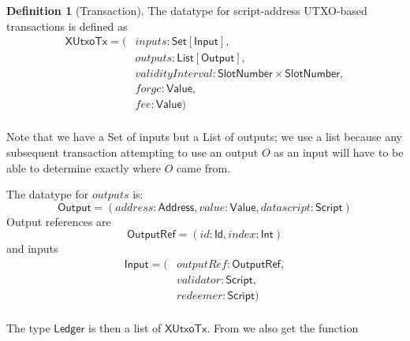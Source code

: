 \documentclass[a4paper]{article}
\theoremstyle{definition}  %
\newtheorem{definition}{Definition}
\begin{document}
\newcommand{\mi}[1]{\ensuremath{\mathit{#1}}}
\newcommand{\inputs}{\ensuremath{\mathit{inputs}}}
\newcommand{\outputs}{\ensuremath{\mathit{outputs}}}
\newcommand{\forge}{\ensuremath{\mathit{forge}}}
\newcommand{\fee}{\ensuremath{\mathit{fee}}}
\newcommand{\addr}{\ensuremath{\mathit{address}}}
\newcommand{\val}{\ensuremath{\mathit{value}}}
\newcommand{\vals}{\ensuremath{\mathit{values}}}

\newcommand{\slotnum}{\ensuremath{\mathsf{SlotNumber}}}
\newcommand{\spent}{\ensuremath{\mathsf{spentOutputs}}}
\newcommand{\unspent}{\ensuremath{\mathsf{unspentOutputs}}}
\newcommand{\xutox}{\ensuremath{\mathsf{XUtxoTx}}}

\noindent\begin{definition}[Transaction]
The datatype for script-address UTXO-based transactions is defined as 
  \begin{align*}
    \xutox = ( &\inputs: \mathsf{Set[Input]},\\
    &\outputs: \mathsf{List[Output]},\\
    &\mathit{validityInterval}: \slotnum \times \slotnum,\\
    &\forge: \mathsf{Value}, \\
    & \fee: \mathsf{Value})\\
  \end{align*}

\noindent Note that we have a \textsf{Set} of inputs but a
\textsf{List} of outputs; we use a list because any subsequent
transaction attempting to use an output $O$ as an input will have to
be able to determine exactly where $O$ came from.


\noindent  The datatype for $outputs$ is:
  \[
      \mathsf{Output} = (\addr: \mathsf{Address}, \val: \mathsf{Value}, \mi{datascript}: \mathsf{Script})
    \]
  Output references are
  \[
    \mathsf{OutputRef} = (\mi{id}: \mathsf{Id}, \mi{index}: \mathsf{Int})
  \]
  and inputs
  \begin{align*}
    \mathsf{Input} = (& \mi{outputRef}: \mathsf{OutputRef},\\
                      & \mi{validator}: \mathsf{Script},\\
                      & \mi{redeemer}: \mathsf{Script})\\
  \end{align*}
\end{definition}


\noindent The type $\mathsf{Ledger}$ is then a list of $\xutox$. From
\cite{Zahnentferner18-UTxO} we also get the function
\end{document}
